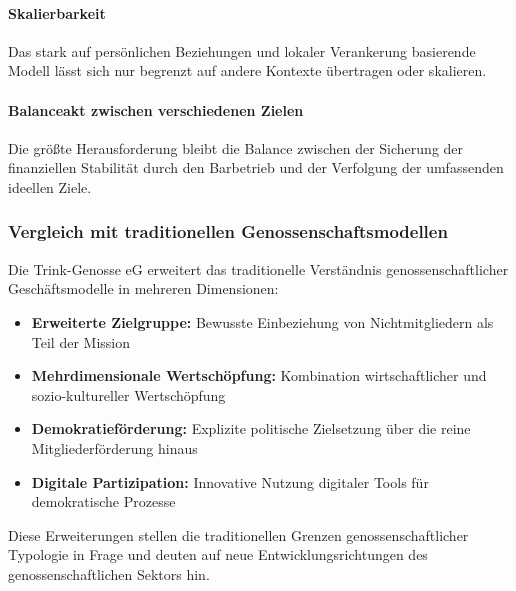 \paragraph{Skalierbarkeit}
Das stark auf persönlichen Beziehungen und lokaler Verankerung basierende Modell lässt sich nur begrenzt auf andere Kontexte übertragen oder skalieren.

\paragraph{Balanceakt zwischen verschiedenen Zielen}
Die größte Herausforderung bleibt die Balance zwischen der Sicherung der finanziellen Stabilität durch den Barbetrieb und der Verfolgung der umfassenden ideellen Ziele.

\subsubsection{Vergleich mit traditionellen Genossenschaftsmodellen}

Die Trink-Genosse eG erweitert das traditionelle Verständnis genossenschaftlicher Geschäftsmodelle in mehreren Dimensionen:

\begin{itemize}
\item \textbf{Erweiterte Zielgruppe:} Bewusste Einbeziehung von Nichtmitgliedern als Teil der Mission
\item \textbf{Mehrdimensionale Wertschöpfung:} Kombination wirtschaftlicher und sozio-kultureller Wertschöpfung
\item \textbf{Demokratieförderung:} Explizite politische Zielsetzung über die reine Mitgliederförderung hinaus
\item \textbf{Digitale Partizipation:} Innovative Nutzung digitaler Tools für demokratische Prozesse
\end{itemize}

Diese Erweiterungen stellen die traditionellen Grenzen genossenschaftlicher Typologie in Frage und deuten auf neue Entwicklungsrichtungen des genossenschaftlichen Sektors hin.
